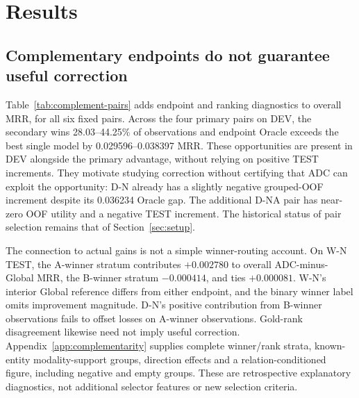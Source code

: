 \documentclass[11pt,a4paper]{article}
\begin{document}
\FloatBarrier
\section{Results}

\subsection{Complementary endpoints do not guarantee useful correction}
\label{sec:complementarity}
Table~\ref{tab:complement-pairs} adds endpoint and ranking diagnostics to overall MRR, for all six fixed pairs. Across the four primary pairs on DEV, the secondary wins 28.03--44.25\% of observations and endpoint Oracle exceeds the best single model by 0.029596--0.038397 MRR. These opportunities are present in DEV alongside the primary advantage, without relying on positive TEST increments. They motivate studying correction without certifying that ADC can exploit the opportunity: D-N already has a slightly negative grouped-OOF increment despite its 0.036234 Oracle gap. The additional D-NA pair has near-zero OOF utility and a negative TEST increment. The historical status of pair selection remains that of Section~\ref{sec:setup}.

The connection to actual gains is not a simple winner-routing account. On W-N TEST, the A-winner stratum contributes $+0.002780$ to overall ADC-minus-Global MRR, the B-winner stratum $-0.000414$, and ties $+0.000081$. W-N's interior Global reference differs from either endpoint, and the binary winner label omits improvement magnitude. D-N's positive contribution from B-winner observations fails to offset losses on A-winner observations. Gold-rank disagreement likewise need not imply useful correction. Appendix~\ref{app:complementarity} supplies complete winner/rank strata, known-entity modality-support groups, direction effects and a relation-conditioned figure, including negative and empty groups. These are retrospective explanatory diagnostics, not additional selector features or new selection criteria.

\end{document}

